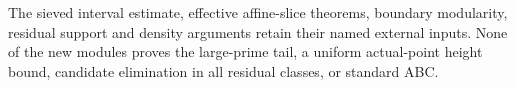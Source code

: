 The sieved interval estimate, effective affine-slice theorems, boundary
modularity, residual support and density arguments retain their named
external inputs. None of the new modules proves the large-prime tail,
a uniform actual-point height bound, candidate elimination in all
residual classes, or standard ABC.
